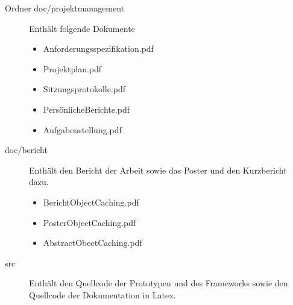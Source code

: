 \begin{description}
\item [Ordner doc/projektmanagement ]
Enthält folgende Dokumente
  \begin{itemize}
    \item Anforderungsspezifikation.pdf
    \item Projektplan.pdf
    \item Sitzungsprotokolle.pdf
    \item PersönlicheBerichte.pdf
    \item Aufgabenstellung.pdf
  \end{itemize}

\item [doc/bericht]
Enthält den Bericht der Arbeit sowie das Poster und den Kurzbericht dazu.
\begin{itemize}
\item BerichtObjectCaching.pdf
\item PosterObjectCaching.pdf
\item AbstractObectCaching.pdf
\end{itemize}

\item[src] Enthält den Quellcode der Prototypen und des Frameworks
  sowie den Quellcode der Dokumentation in Latex.

\end{description}